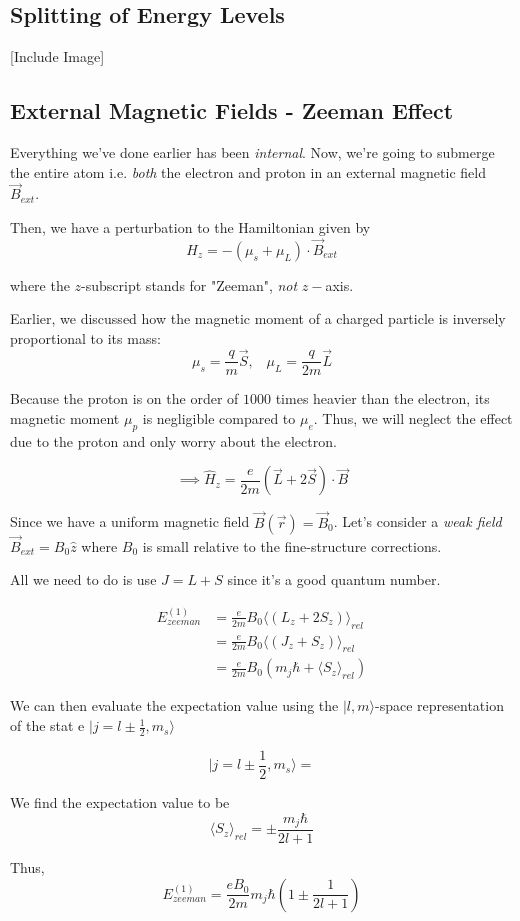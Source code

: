 \documentclass{article}
\newcommand{\ket}[1]{|#1 \rangle}
\newcommand{\mean}[1]{\langle #1 \rangle}
\begin{document}
\subsection{Splitting of Energy Levels}

[Include Image]

\subsection{External Magnetic Fields - Zeeman Effect}
Everything we've done earlier has been \emph{internal}. Now, we're going to submerge the entire atom i.e. \emph{both} the electron and proton in an external magnetic field $\vec{B}_{ext}$.

\vskip 0.5cm
Then, we have a perturbation to the Hamiltonian given by 
\[ \hat{H}_z  =  -(\mu_s + \mu_L) \cdot \vec{B}_{ext} \]

where the $z$-subscript stands for "Zeeman", \emph{not} $z-$axis.

Earlier, we discussed how the magnetic moment of a charged particle is inversely proportional to its mass:
\[ \mu_s = \frac{q}{m} \vec{S}, \;\;\; \mu_L = \frac{q}{2m} \vec{L} \]

Because the proton is on the order of $1000$ times heavier than the electron, its magnetic moment $\mu_p$ is negligible compared to $\mu_e$. Thus, we will neglect the effect due to the proton and only worry about the electron.

\vskip 0.5cm
\[ \implies \hat{H}_z = \frac{e}{2m} \left( \vec{L}  + 2\vec{S} \right) \cdot \vec{B} \]

Since we have a uniform magnetic field $\vec{B}(\vec{r}) = \vec{B}_0$. Let's consider a \emph{weak field} $\vec{B}_{ext} = B_0 \hat{z}$ where $B_0$ is small relative to the fine-structure corrections.

All we need to do is use $J = L + S$ since it's a good quantum number.

\begin{align*}
  E_{zeeman}^{(1)} &= \frac{e}{2m} B_0 \mean{ (L_z + 2S_z) }_{rel} \\
  &= \frac{e}{2m} B_0 \mean{(J_z + S_z)}_{rel} \\
  &= \frac{e}{2m} B_0 \left( m_j \hbar + \mean{S_z}_{rel} \right)
\end{align*}

We can then evaluate the expectation value using the $\ket{l, m}$-space representation of the stat e $\ket{j = l \pm \frac{1}{2}, m_s}$ 

\[ \ket{j = l \pm \frac{1}{2}, m_s} =  \]

We find the expectation value to be 
\[ \mean{S_z}_{rel} = \pm\frac{m_j \hbar}{2l+1} \]

Thus, 
\[ \boxed{ E_{zeeman}^{(1)} = \frac{eB_0}{2m} m_j \hbar \left( 1 \pm \frac{1}{2l+1} \right) } \]
\end{document}

